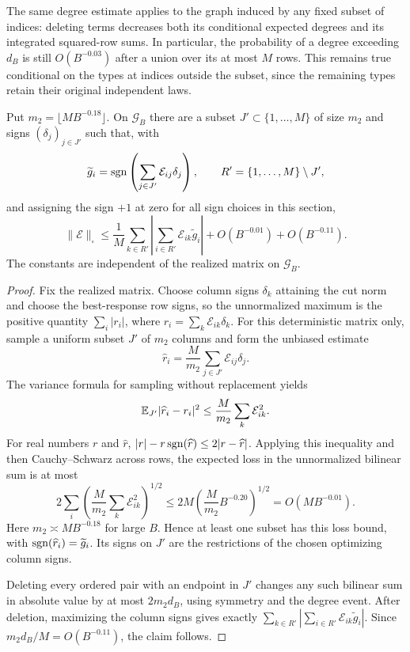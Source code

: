 The same degree estimate applies to the graph induced by any fixed
subset of indices: deleting terms decreases both its conditional
expected degrees and its integrated squared-row sums.  In particular,
the probability of a degree exceeding $d_B$ is still
$O(B^{-0.03})$ after a union over its at most $M$ rows.  This remains
true conditional on the types at indices outside the subset, since
the remaining types retain their original independent laws.

\begin{lemma}
\label{lem:sampling-skeleton}
Put $m_2=\lfloor M B^{-0.18}\rfloor$.  On $\mathcal G_B$ there
are a subset $J'\subset\{1,\ldots,M\}$ of size $m_2$ and
signs $(\delta_j)_{j\in J'}$ such that, with
\[
 \widetilde g_i
 =\operatorname{sgn}\left(\sum_{j\in J'}\mathcal E_{ij}\delta_j\right),
 \qquad R' =\{1,\ldots,M\}\setminus J',
\]
and assigning the sign $+1$ at zero for all sign choices in this section,
\[
 \|\mathcal E\|_\square
 \le\frac1M\sum_{k\in R'}
       \left|\sum_{i\in R'}\mathcal E_{ik}\widetilde g_i\right|
       +O(B^{-0.01})+O(B^{-0.11}).
\]
The constants are independent of the realized matrix on $\mathcal G_B$.
\end{lemma}

\begin{proof}
Fix the realized matrix.  Choose column signs $\delta_k$ attaining
the cut norm and choose the best-response row signs, so the
unnormalized maximum is the positive quantity
$\sum_i|r_i|$, where $r_i=\sum_k\mathcal E_{ik}\delta_k$.
For this deterministic matrix only, sample a uniform subset $J'$
of $m_2$ columns and form the unbiased estimate
\[
 \widehat r_i=\frac{M}{m_2}\sum_{j\in J'}\mathcal E_{ij}\delta_j.
\]
The variance formula for sampling without replacement yields
\[
 \mathbb E_{J'}|\widehat r_i-r_i|^2
       \le\frac{M}{m_2}\sum_k\mathcal E_{ik}^2.
\]
For real numbers $r$ and $\widehat r$,
$|r|-r\operatorname{sgn}(\widehat r)\le2|r-\widehat r|$.
Applying this inequality and then Cauchy--Schwarz across rows,
the expected loss in the unnormalized bilinear sum is at most
\[
 2\sum_i\left(\frac{M}{m_2}
                       \sum_k\mathcal E_{ik}^2\right)^{1/2}
 \le 2M\left(\frac{M}{m_2}B^{-0.20}\right)^{1/2}
 =O(M B^{-0.01}).
\]
Here $m_2\asymp M B^{-0.18}$ for large $B$.  Hence at least
one subset has this loss bound, with
$\operatorname{sgn}(\widehat r_i)=\widetilde g_i$.  Its signs on $J'$ are
the restrictions of the chosen optimizing column signs.

Deleting every ordered pair with an endpoint in $J'$ changes
any such bilinear sum in absolute value by at most
$2m_2d_B$, using symmetry and the degree event.  After deletion,
maximizing the column signs gives exactly
$\sum_{k\in R'}|\sum_{i\in R'}\mathcal E_{ik}\widetilde g_i|$.
Since $m_2d_B/M=O(B^{-0.11})$, the claim follows.
\end{proof}

